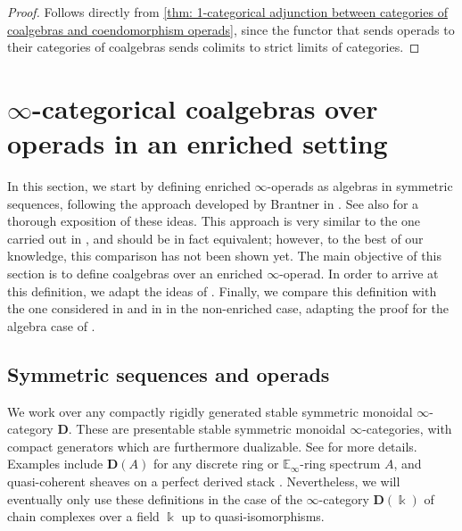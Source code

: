 \documentclass{proc-l}
\theoremstyle{plain}
\theoremstyle{definition}
\theoremstyle{remark}
\newcommand{\kk}{\Bbbk}
\begin{document}
\begin{proof}
Follows directly from \cref{thm: 1-categorical adjunction between categories of coalgebras and coendomorphism operads}, since the functor that sends operads to their categories of coalgebras sends colimits to strict limits of categories.
\end{proof}

\vspace{1pc}

\section{$\infty$-categorical coalgebras over operads in an enriched setting}%
\label{Section:3}

\vspace{2.5pc}

In this section, we start by defining enriched $\infty$-operads as algebras in symmetric sequences, following the approach developed by Brantner in \cite[Section 4.1.2]{BrantnerPhD}. See also \cite[Section 5.2.4]{ShiPhD} for a thorough exposition of these ideas. This approach is very similar to the one carried out in \cite{Haugseng}, and should be in fact equivalent; however, to the best of our knowledge, this comparison has not been shown yet. The main objective of this section is to define coalgebras over an enriched $\infty$-operad. In order to arrive at this definition, we adapt the ideas of \cite[Appendix A]{heuts2024}. Finally, we compare this definition with the one considered in \cite{ellipticI} and in \cite{peroux} in the non-enriched case, adapting the proof for the algebra case of \cite[Appendix A.2.]{ShiPhD}.

\subsection{Symmetric sequences and operads}%
\label{Section:3.1}
We work over any compactly rigidly generated stable symmetric monoidal $\infty$-category $\mathbf{D}$. These are presentable stable symmetric monoidal $\infty$-categories, with compact generators which are furthermore dualizable. See \cite{ramzi2024locallyrigidinftycategories} for more details. Examples include $\mathbf{D}(A)$ for any discrete ring or $\mathbb{E}_\infty$-ring spectrum $A$, and quasi-coherent sheaves on a perfect derived stack \cite[Proposition 3.9]{bfn}. Nevertheless, we will eventually only use these definitions in the case of the $\infty$-category $\mathbf{D}(\kk)$ of chain complexes over a field $\kk$ up to quasi-isomorphisms.
\end{document}
